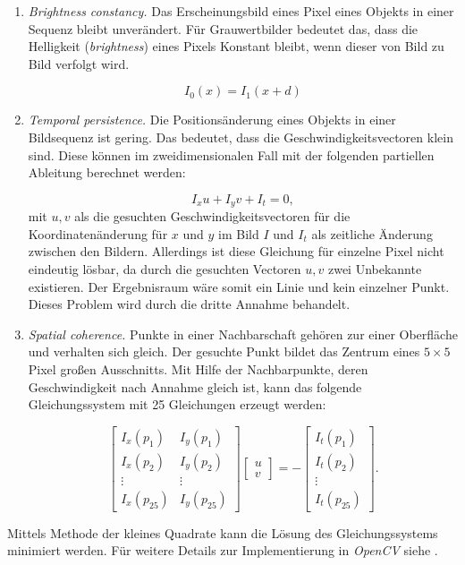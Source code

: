 	\begin{enumerate}
	\item \textit{Brightness constancy.} Das Erscheinungsbild eines Pixel eines Objekts in einer Sequenz bleibt unverändert. Für Grauwertbilder bedeutet das, dass die Helligkeit (\textit{brightness}) eines Pixels Konstant bleibt, wenn dieser von Bild zu Bild verfolgt wird.
	
	\begin{equation}
	I_{0}(x)=I_{1}(x+d)
	\end{equation}

	\item \textit{Temporal persistence. }Die Positionsänderung eines Objekts in einer Bildsequenz ist gering. Das bedeutet, dass die Geschwindigkeitsvectoren klein sind. Diese können im zweidimensionalen Fall mit der folgenden partiellen Ableitung berechnet werden:
	
	\begin{equation} I_{x}u+I_{y}v+I_{t}=0, \end{equation}
	mit $u,v$ als die gesuchten Geschwindigkeitsvectoren für die Koordinatenänderung für $x$ und $y$ im Bild $I$ und $I_{t}$ als zeitliche Änderung zwischen den Bildern. Allerdings ist diese Gleichung für einzelne Pixel nicht eindeutig lösbar, da durch die gesuchten Vectoren $u,v$ zwei Unbekannte existieren. Der Ergebnisraum wäre somit ein Linie und kein einzelner Punkt. Dieses Problem wird durch die dritte Annahme behandelt.

	\item \textit{Spatial coherence.} Punkte in einer Nachbarschaft gehören zur einer Oberfläche und verhalten sich gleich. Der gesuchte Punkt bildet das Zentrum eines $5\times5$ Pixel großen Ausschnitts.
	Mit Hilfe der Nachbarpunkte, deren Geschwindigkeit nach Annahme gleich ist, kann das folgende Gleichungssystem mit 25 Gleichungen erzeugt werden:

	\begin{equation}
	\left[\begin{array}{cc}
	I_{x}(p_{1}) & I_{y}(p_{1})\\
	I_{x}(p_{2}) & I_{y}(p_{2})\\
	\vdots & \vdots\\
	I_{x}(p_{25}) & I_{y}(p_{25})
	\end{array}\right]\left[\begin{array}{c}
	u\\
	v
	\end{array}\right]=-\left[\begin{array}{c}
	I_{t}(p_{1})\\
	I_{t}(p_{2})\\
	\vdots\\
	I_{t}(p_{25})
	\end{array}\right].
	\end{equation}
	\end{enumerate}
	Mittels Methode der kleines Quadrate kann die Lösung des Gleichungssystems minimiert werden. Für weitere Details zur Implementierung in \textit{OpenCV}
	siehe \cite{OCV}.
	
